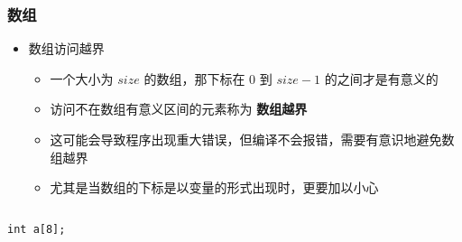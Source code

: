 \begin{frame}[fragile]
    \frametitle{数组}

    \begin{overlayarea}{\textwidth}{.55\textheight}
        \begin{itemize}
            \item 数组访问越界

                \begin{itemize}
                    \item 一个大小为 $size$ 的数组，那下标在 $0$ 到 $size-1$ 的之间才是有意义的
                    \item 访问不在数组有意义区间的元素称为 \textbf{数组越界}
                \end{itemize}

                \begin{itemize}
                    \item<2-> 这可能会导致程序出现重大错误，但编译不会报错，需要有意识地避免数组越界
                    \item<2-> 尤其是当数组的下标是以变量的形式出现时，更要加以小心
                \end{itemize}

        \end{itemize}
    \end{overlayarea}

    \begin{columns}

        \lstinline|int a[8];|

    \end{columns}
\end{frame}


